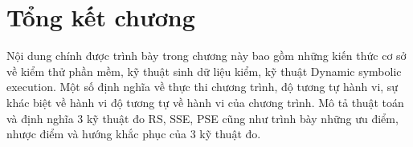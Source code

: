 \section*{Tổng kết chương}  
Nội dung chính được trình bày trong chương này bao gồm những kiến thức cơ sở về kiểm thử phần mềm, kỹ thuật sinh dữ liệu kiểm, kỹ thuật Dynamic symbolic execution. Một số định nghĩa về thực thi chương trình, độ tương tự hành vi, sự khác biệt về hành vi độ tương tự về hành vi của chương trình. Mô tả thuật toán và định nghĩa 3 kỹ thuật đo RS, SSE, PSE cũng như trình bày những ưu điểm, nhược điểm và hướng khắc phục của 3 kỹ thuật đo. 
  
